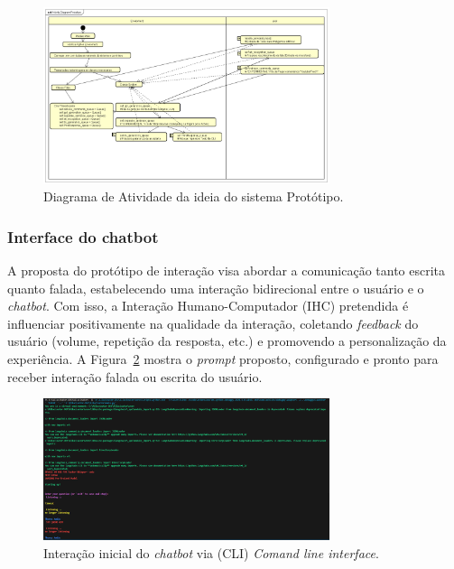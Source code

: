 \documentclass[10pt, conference, compsocconf]{IEEEtran}
\begin{document}
\begin{figure}[!h]
\centering
\includegraphics[width=3.3in]{images/Activity Diagram Prototipo.png}
\caption{Diagrama de Atividade da ideia do sistema Protótipo.} 
\label{fig:Diagrama de Atividade}
\end{figure}

\FloatBarrier

\subsubsection{Interface do chatbot} %
A proposta do protótipo de interação visa abordar a comunicação tanto escrita quanto falada, estabelecendo uma interação bidirecional entre o usuário e o \textit{chatbot}. Com isso, a Interação Humano-Computador (IHC) pretendida é influenciar positivamente na qualidade da interação, coletando \textit{feedback} do usuário (volume, repetição da resposta, etc.) e promovendo a personalização da experiência. A Figura~\ref{fig:chatbot} mostra o \textit{prompt} proposto, configurado e pronto para receber interação falada ou escrita do usuário.

\FloatBarrier

\begin{figure}[!h]
\centering
\includegraphics[width=3.3in]{images/Prototipo test.png}
\caption{Interação inicial do \textit{chatbot} via (CLI) \textit{Comand line interface}.} 
\label{fig:chatbot}
\end{figure}

\FloatBarrier
\end{document}
